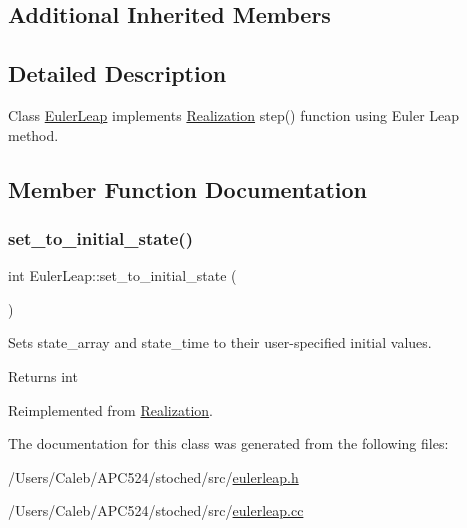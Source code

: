 \subsection*{Additional Inherited Members}


\subsection{Detailed Description}
Class \hyperlink{class_euler_leap}{Euler\+Leap} implements \hyperlink{class_realization}{Realization} step() function using Euler Leap method. 

\subsection{Member Function Documentation}
\mbox{\label{class_euler_leap_a1a13929ea1ebf40e7357439968828f4b}} 
\subsubsection{\texorpdfstring{set\+\_\+to\+\_\+initial\+\_\+state()}{set\_to\_initial\_state()}}
{\footnotesize\ttfamily int Euler\+Leap\+::set\+\_\+to\+\_\+initial\+\_\+state (\begin{DoxyParamCaption}{ }\end{DoxyParamCaption})\hspace{0.3cm}{\ttfamily [virtual]}}



Sets state\+\_\+array and state\+\_\+time to their user-\/specified initial values. 

\begin{DoxyReturn}{Returns}
int 
\end{DoxyReturn}


Reimplemented from \hyperlink{class_realization_a391a89af7574a9053f53f8a299c2cc70}{Realization}.



The documentation for this class was generated from the following files\+:\begin{DoxyCompactItemize}
\item 
/\+Users/\+Caleb/\+A\+P\+C524/stoched/src/\hyperlink{eulerleap_8h}{eulerleap.\+h}\item 
/\+Users/\+Caleb/\+A\+P\+C524/stoched/src/\hyperlink{eulerleap_8cc}{eulerleap.\+cc}\end{DoxyCompactItemize}
